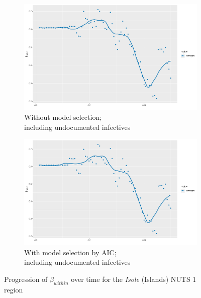 \documentclass[12pt]{article}
\begin{document}
\begin{appendices}
\begin{figure}[H]
\begin{subfigure}{\textwidth}
    	      \includegraphics[width=0.95\linewidth]{output/model1_lag3_betawithin_Isole_UndocQuadratic_rolling.pdf}
    	      \caption{Without model selection; \\ including undocumented infectives}
    	      \label{fig:beta_within_over_time_isole_regular_undoc}
    	    \end{subfigure}\newline
    	    \begin{subfigure}{\textwidth}
    	      \centering
    	      \includegraphics[width=0.95\linewidth]{output/model1_lag3_betawithin_Isole_aic_UndocQuadratic_rolling.pdf}
    	      \caption{With model selection by AIC; \\ including undocumented infectives}
    	      \label{fig:beta_within_over_time_isole_aic_undoc}
    	    \end{subfigure}
    	    \caption{Progression of $\beta_{within}$ over time for the \textit{Isole} (Islands) NUTS 1 region}
    	    \label{fig:beta_within_over_time_isole}
	    \end{figure}
		

\end{appendices}
\end{document}
